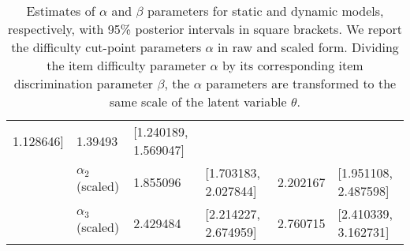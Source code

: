 \documentclass[12pt,letterpaper,leqno]{article}\usepackage[]{graphicx}\usepackage[]{color}
\begin{document}
\begin{table}[!h]
\begin{tabular}{p{.5cm}p{2cm}p{1.5cm}p{4cm}p{1.5cm}p{4cm}}
                         1.128646]
                         & 1.39493 
                         & [1.240189, 
                         1.569047]\\
 & $\alpha_{2}$ (scaled) & 1.855096 
                         & [1.703183, 
                         2.027844]
                         & 2.202167 
                         & [1.951108, 
                         2.487598]\\
 & $\alpha_{3}$ (scaled) & 2.429484 
                         & [2.214227, 
                         2.674959]
                         & 2.760715 
                         & [2.410339, 
                         3.162731]\\
\hline 
\end{tabular}
\caption{Estimates of $\alpha$ and $\beta$ parameters for static and dynamic models, respectively, with 95\% posterior  intervals in square brackets. We report the difficulty cut-point parameters $\alpha$ in raw and scaled form. Dividing the  item difficulty parameter $\alpha$ by its corresponding item discrimination parameter $\beta$, the  $\alpha$ parameters are transformed to the same scale of the latent variable $\theta$.
}\label{tb:params:alpha:beta}
\end{table}
\end{document}
